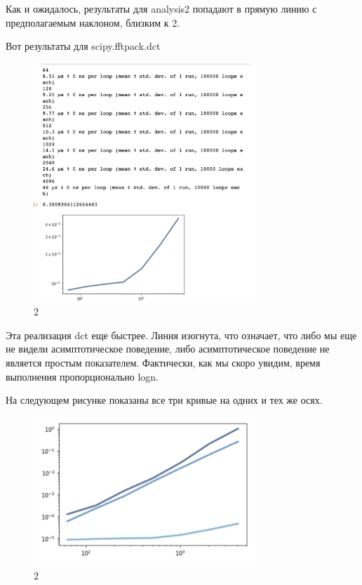\documentclass[10pt,a4paper,oneside]{article}
\begin{document}
Как и ожидалось, результаты для analysis2 попадают в прямую линию с предполагаемым наклоном, близким к 2.

Вот результаты для scipy.fftpack.dct

\begin{figure}[H]
        \centering
        \includegraphics[width=0.75\textwidth]{pics/5.png}
        \caption{2}
        \label{fig:first}
\end{figure}

Эта реализация dct еще быстрее. Линия изогнута, что означает, что либо мы еще не видели асимптотическое поведение, либо асимптотическое поведение не является простым показателем. Фактически, как мы скоро увидим, время выполнения пропорционально logn.

На следующем рисунке показаны все три кривые на одних и тех же осях.

\begin{figure}[H]
        \centering
        \includegraphics[width=0.75\textwidth]{pics/6.png}
        \caption{2}
        \label{fig:first}
\end{figure}
\end{document}
